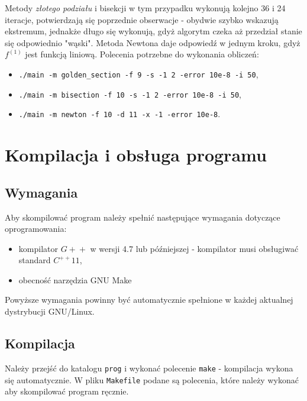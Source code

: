 \documentclass[a4paper,11pt]{article}
\begin{document}
      Metody \emph{złotego podziału} i bisekcji w tym przypadku wykonują kolejno 36 i 24 iteracje, potwierdzają się poprzednie obserwacje - obydwie szybko wskazują ekstremum, jednakże długo się wykonują, gdyż algorytm czeka aż przedział stanie się odpowiednio "wąski". Metoda Newtona daje odpowiedź w jednym kroku, gdyż $ f^{(1)} $ jest funkcją liniową. Polecenia potrzebne do wykonania obliczeń:
      \begin{itemize}
        \item \texttt{./main -m golden\_section -f 9 -s -1 2 -error 10e-8 -i 50},
        \item \texttt{./main -m bisection -f 10 -s -1 2 -error 10e-8 -i 50},
        \item \texttt{./main -m newton -f 10 -d 11 -x -1 -error 10e-8}.
      \end{itemize}
     
  \section{Kompilacja i obsługa programu}
    \subsection{Wymagania}
    Aby skompilować program należy spełnić następujące wymagania dotyczące oprogramowania:
    \begin{itemize}
      \item kompilator $ G\!+\!+ $ w wersji 4.7 lub późniejszej - kompilator musi obsługiwać standard $ C^{++}11 $,
      \item obecność narzędzia GNU Make
    \end{itemize}
    Powyższe wymagania powinny być automatycznie spełnione w każdej aktualnej dystrybucji GNU/Linux.
    
    \subsection{Kompilacja}
    Należy przejść do katalogu \texttt{prog} i wykonać polecenie \texttt{make} - kompilacja wykona się automatycznie. W pliku \texttt{Makefile} podane są polecenia, które należy wykonać aby skompilować program ręcznie.
    
\end{document}
